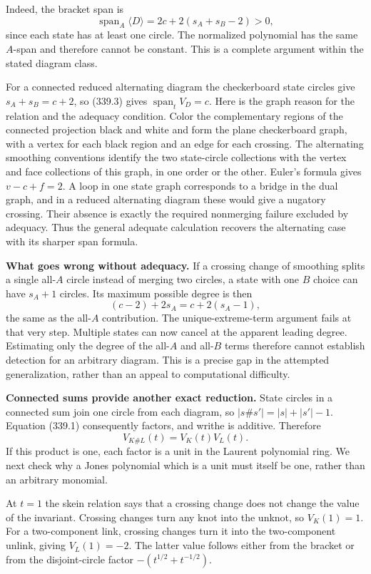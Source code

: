 \documentclass[11pt]{article}
\begin{document}
Indeed, the bracket span is
\[
 \operatorname{span}_A\langle D\rangle
   =2c+2(s_A+s_B-2)>0,
 \tag{339.3}
\]
since each state has at least one circle. The normalized polynomial has the same $A$-span and therefore cannot be constant. This is a complete argument within the stated diagram class.

For a connected reduced alternating diagram the checkerboard state circles give $s_A+s_B=c+2$, so (339.3) gives $\operatorname{span}_tV_D=c$. Here is the graph reason for the relation and the adequacy condition. Color the complementary regions of the connected projection black and white and form the plane checkerboard graph, with a vertex for each black region and an edge for each crossing. The alternating smoothing conventions identify the two state-circle collections with the vertex and face collections of this graph, in one order or the other. Euler's formula gives $v-c+f=2$. A loop in one state graph corresponds to a bridge in the dual graph, and in a reduced alternating diagram these would give a nugatory crossing. Their absence is exactly the required nonmerging failure excluded by adequacy. Thus the general adequate calculation recovers the alternating case with its sharper span formula.

\textbf{What goes wrong without adequacy.} If a crossing change of smoothing splits a single all-$A$ circle instead of merging two circles, a state with one $B$ choice can have $s_A+1$ circles. Its maximum possible degree is then
\[
 (c-2)+2s_A=c+2(s_A-1),
\]
the same as the all-$A$ contribution. The unique-extreme-term argument fails at that very step. Multiple states can now cancel at the apparent leading degree. Estimating only the degree of the all-$A$ and all-$B$ terms therefore cannot establish detection for an arbitrary diagram. This is a precise gap in the attempted generalization, rather than an appeal to computational difficulty.

\textbf{Connected sums provide another exact reduction.} State circles in a connected sum join one circle from each diagram, so $|s\#s'|=|s|+|s'|-1$. Equation (339.1) consequently factors, and writhe is additive. Therefore
\[
 V_{K\#L}(t)=V_K(t)V_L(t).
 \tag{339.4}
\]
If this product is one, each factor is a unit in the Laurent polynomial ring. We next check why a Jones polynomial which is a unit must itself be one, rather than an arbitrary monomial.

At $t=1$ the skein relation says that a crossing change does not change the value of the invariant. Crossing changes turn any knot into the unknot, so $V_K(1)=1$. For a two-component link, crossing changes turn it into the two-component unlink, giving $V_L(1)=-2$. The latter value follows either from the bracket or from the disjoint-circle factor $-(t^{1/2}+t^{-1/2})$.
\end{document}
